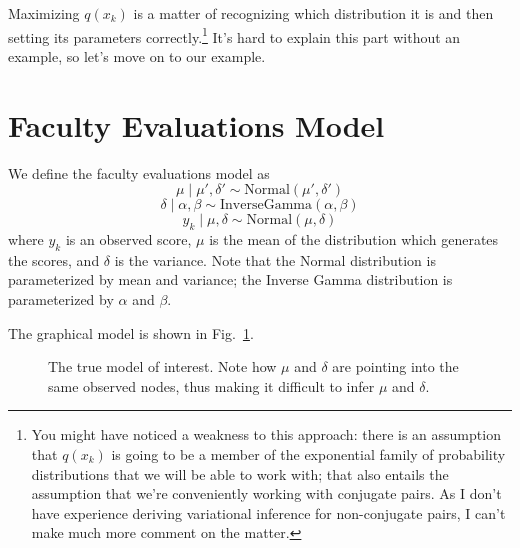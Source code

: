 \documentclass[12pt]{article}
\begin{document}
Maximizing $q(x_{k})$ is a matter of recognizing which distribution it is and
then setting its parameters correctly.\footnote{You might have noticed a
weakness to this approach:  there is an assumption that $q(x_{k})$ is going to
be a member of the exponential family of probability distributions that we will
be able to work with; that also entails the assumption that we're conveniently
working with conjugate pairs.  As I don't have experience deriving variational
inference for non-conjugate pairs, I can't make much more comment on the
matter.}  It's hard to explain this part without an example, so let's move on to
our example.

\section{Faculty Evaluations Model}

We define the faculty evaluations model as
\begin{equation}
    \mu \mid \mu', \delta' \sim \text{Normal}(\mu', \delta')
\end{equation}
\begin{equation}
    \delta \mid \alpha, \beta \sim \text{InverseGamma}(\alpha, \beta)
\end{equation}
\begin{equation}
    y_{k} \mid \mu, \delta \sim \text{Normal}(\mu, \delta)
\end{equation}
where $y_{k}$ is an observed score, $\mu$ is the mean of the distribution which
generates the scores, and $\delta$ is the variance.  Note that the Normal
distribution is parameterized by mean and variance; the Inverse Gamma
distribution is parameterized by $\alpha$ and $\beta$.

The graphical model is shown in Fig.~\ref{fig:pmodel}.

\begin{figure}[h]
    \centering
{}
    \caption{The true model of interest.  Note how $\mu$ and $\delta$ are
    pointing into the same observed nodes, thus making it difficult to infer
    $\mu$ and $\delta$.}
    \label{fig:pmodel}
\end{figure}
\end{document}
